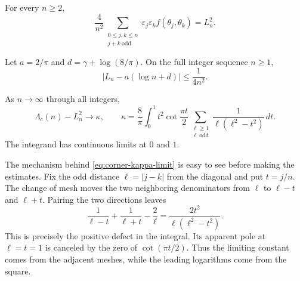 \begin{lemma}\label{lem:corner-reference-square}
For every $n\geq2$,
\[
 \frac4{n^2}\sum_{\substack{0\leq j,k\leq n\\j+k\ \mathrm{odd}}}
      \varepsilon_j\varepsilon_k f(\theta_j,\theta_k)=L_n^2.
\]
\end{lemma}

\begin{lemma}\label{lem:corner-one-dimensional}
Let $a=2/\pi$ and $d=\gamma+\log(8/\pi)$.  On the full integer
sequence $n\geq1$,
\begin{equation}\label{eq:corner-L-estimate}
 \left|L_n-a(\log n+d)\right|\leq\frac1{4n^2}.
\end{equation}
\end{lemma}

\begin{lemma}\label{lem:corner-defect-limit}
As $n\to\infty$ through all integers,
\begin{equation}\label{eq:corner-kappa-limit}
 \Lambda_c(n)-L_n^2\longrightarrow\kappa,
 \qquad
 \kappa=\frac8\pi\int_0^1 t^2\cot\frac{\pi t}{2}
       \sum_{\substack{\ell\geq1\\\ell\ \mathrm{odd}}}
              \frac1{\ell(\ell^2-t^2)}\,dt.
\end{equation}
The integrand has continuous limits at $0$ and $1$.
\end{lemma}

The mechanism behind \eqref{eq:corner-kappa-limit} is easy to see
before making the estimates.  Fix the odd distance $\ell=|j-k|$
from the diagonal and put $t=j/n$.  The change of mesh moves the
two neighboring denominators from $\ell$ to $\ell-t$ and
$\ell+t$.  Pairing the two directions leaves
\[
 \frac1{\ell-t}+\frac1{\ell+t}-\frac2\ell
       =\frac{2t^2}{\ell(\ell^2-t^2)}.
\]
This is precisely the positive defect in the integral.  Its apparent
pole at $\ell=t=1$ is canceled by the zero of
$\cot(\pi t/2)$.  Thus the limiting constant comes from the
adjacent meshes, while the leading logarithms come from the square.
